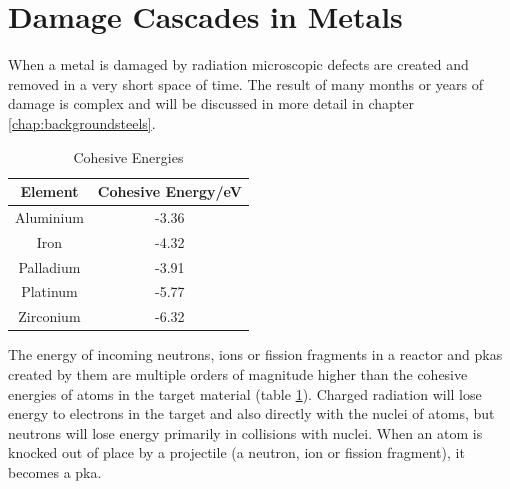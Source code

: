 \FloatBarrier

\section{Damage Cascades in Metals}

When a metal is damaged by radiation microscopic defects are created and removed in a very short space of time.  The result of many months or years of damage is complex and will be discussed in more detail in chapter \ref{chap:backgroundsteels}.

\begin{table}[h]
\begin{center}
\renewcommand{\arraystretch}{1.2}
\begin{tabular}{c c}
\hline\hline
Element & Cohesive Energy/eV \\
\hline\hline
Aluminium & -3.36 \\
Iron & -4.32 \\
Palladium & -3.91 \\
Platinum & -5.77 \\
Zirconium & -6.32 \\
\hline\hline
\end{tabular}
\end{center}
\caption{Cohesive Energies \cite{shengeamonline}}
\label{table:cohesiveexamples}
\end{table}

The energy of incoming neutrons, ions or fission fragments in a reactor and \acrshort{pka}s created by them are multiple orders of magnitude higher than the cohesive energies of atoms in the target material (table \ref{table:cohesiveexamples}).  Charged radiation will lose energy to electrons in the target and also directly with the nuclei of atoms, but neutrons will lose energy primarily in collisions with nuclei.  When an atom is knocked out of place by a projectile (a neutron, ion or fission fragment), it becomes a \acrshort{pka}. 

